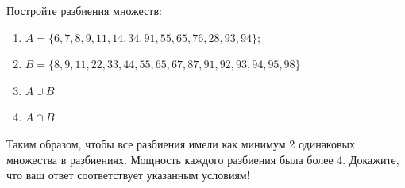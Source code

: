 \question
Постройте разбиения множеств:
\begin{enumerate}
	\renewcommand{\labelenumi}{\alph{enumi})}
	\item $A = \{6, 7, 8, 9, 11, 14, 34, 91, 55, 65, 76, 28, 93, 94\};$
	\item $B = \{8, 9, 11, 22, 33, 44, 55, 65, 67, 87, 91, 92, 93, 94, 95, 98\}$
	\item $A \cup B$
	\item $A \cap B$
\end{enumerate}
Таким образом, чтобы все разбиения имели как минимум 2 одинаковых множества в разбиениях.
Мощность каждого разбиения была более 4.
Докажите, что ваш ответ соответствует указанным условиям!
